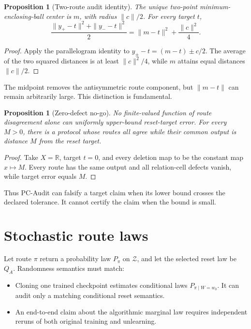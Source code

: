 \documentclass[10pt]{article}
\newtheorem{proposition}[theorem]{Proposition}
\theoremstyle{definition}
\theoremstyle{remark}
\newcommand{\R}{\mathbb{R}}
\newcommand{\cZ}{\mathcal{Z}}
\begin{document}
\begin{proposition}[Two-route audit identity]
\label{prop:hilbert}
The unique two-point minimum-enclosing-ball center is \(m\), with radius
\(\|c\|/2\). For every target \(t\),
\[
 \frac{\|y_+-t\|^2+\|y_--t\|^2}{2}
 =
 \|m-t\|^2+\frac{\|c\|^2}{4}.
 \tag{4.2}
\]
\end{proposition}

\begin{proof}
Apply the parallelogram identity to
\(y_\pm-t=(m-t)\pm c/2\). The average of the two squared distances is at least
\(\|c\|^2/4\), while \(m\) attains equal distances \(\|c\|/2\).
\end{proof}

The midpoint removes the antisymmetric route component, but
\(\|m-t\|\) can remain arbitrarily large. This distinction is fundamental.

\begin{proposition}[Zero-defect no-go]
\label{prop:nogo}
No finite-valued function of route disagreement alone can uniformly
upper-bound reset-target error. For every \(M>0\), there is a protocol whose
routes all agree while their common output is distance \(M\) from the reset
target.
\end{proposition}

\begin{proof}
Take \(X=\R\), target \(t=0\), and every deletion map to be the constant map
\(x\mapsto M\). Every route has the same output and all relation-cell defects
vanish, while target error equals \(M\).
\end{proof}

Thus PC-Audit can falsify a target claim when its lower bound crosses the
declared tolerance. It cannot certify the claim when the bound is small.

\section{Stochastic route laws}

Let route \(\pi\) return a probability law \(P_\pi\) on \(\cZ\), and let the
selected reset law be \(Q_A\). Randomness semantics must match:

\begin{itemize}
  \item Cloning one trained checkpoint estimates conditional laws
  \(P_{\pi\mid W=w_0}\). It can audit only a matching conditional reset
  semantics.
  \item An end-to-end claim about the algorithmic marginal law requires
  independent reruns of both original training and unlearning.
\end{itemize}
\end{document}
